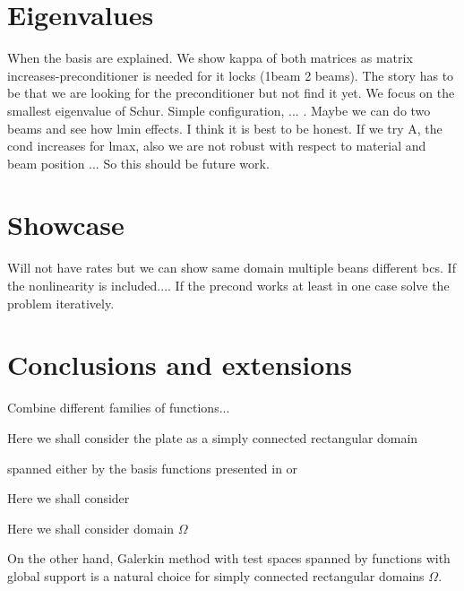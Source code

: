 \documentclass{marine_2015}
\newcommand{\deriv}[2]{\ensuremath{\frac{\mathrm{d}#1}{\mathrm{d}#2}}}
\begin{document}
\section{Eigenvalues}
\label{sec:lbb}
When the basis are explained. We show kappa of both matrices as matrix
increases-preconditioner is needed for it locks (1beam 2 beams). The story has
to be that we are looking for the preconditioner but not find it yet. We focus
on the smallest eigenvalue of Schur. Simple configuration, ... . Maybe we can
do two beams and see how lmin effects. I think it is best to be honest. If we
try A, the cond increases for lmax, also we are not robust with respect to
material and beam position ... So this should be future work.

\section{Showcase}
Will not have rates but we can show same domain multiple beans different bcs. If
the nonlinearity is included.... If the precond works at least in one case solve
the problem iteratively.

\section{Conclusions and extensions}
Combine different families of functions...








Here we shall consider 
the plate as a simply connected rectangular domain


spanned 
either by the basis functions presented in \cite{shen} or 


Here we shall
consider


Here we shall consider domain 
$\Omega$ 








On the other hand, Galerkin method with test spaces spanned by functions with 
global support is a natural choice for simply connected rectangular domains $\Omega$.
\end{document}
